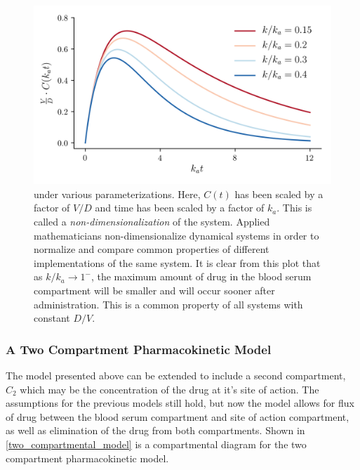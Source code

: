 \begin{figure}[h!]
	\centering
	\includegraphics{Figures/pkcureves.png}
	\caption{ under various parameterizations.  Here, $ C(t) $ has been scaled by a factor of $ V/D $ and time has been scaled by a factor of $ k_a $.  This is called a \textit{non-dimensionalization} of the system.  Applied mathematicians non-dimensionalize dynamical systems in order to normalize and compare common properties of different implementations of the same system.  It is clear from this plot that as $ k/k_a \rightarrow 1^- $, the maximum amount of drug in the blood serum compartment will be smaller and will occur sooner after administration.  This is a common property of all systems with constant $D/V$. }
	\label{fig:pkcureves}
\end{figure}


\subsubsection{A Two Compartment Pharmacokinetic Model}

The model presented above can be extended to include a second compartment, $C_2$ which may be the concentration of the drug at it's site of action.  The assumptions for the previous models still hold, but now the model allows for flux of drug between the blood serum compartment and site of action compartment, as well as elimination of the drug from both compartments. Shown in \cref{two_compartmental_model} is a compartmental diagram for the two compartment pharmacokinetic model.

